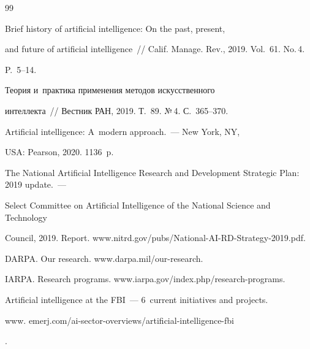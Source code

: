 {\small\frenchspacing

{%


\begin{thebibliography}{99}



\vspace*{-2pt}




 Brief history of artificial intelligence: On the past, present, 

and future of artificial intelligence~/\!\!/ Calif. Manage. Rev., 2019. Vol.~61. No.\,4. 

P.~5--14.


 Теория и~практика применения методов искусственного 

интеллекта~/\!\!/ Вестник РАН, 2019. Т.~89. №\,4. С.~365--370.




 Artificial intelligence: A~modern approach.~--- New York, NY, 

USA: Pearson, 2020. 1136~p.




The National Artificial Intelligence Research and Development Strategic Plan: 2019 update.~---

Select Committee on Artificial Intelligence of the National Science and Technology 

Council, 2019.  Report. {\sf www.nitrd.gov/pubs/National-AI-RD-Strategy-2019.pdf}.


DARPA. Our research. {\sf www.darpa.mil/our-research}.


IARPA. Research programs. {\sf www.iarpa.gov/index.php/research-programs}.


 Artificial intelligence at the FBI~--- 6~current initiatives and projects. {\sf  

www. emerj.com/ai-sector-overviews/artificial-intelligence-fbi}.



\end{thebibliography}}}
